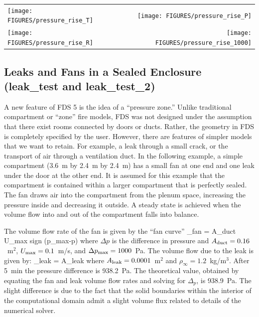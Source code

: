 \documentclass[11pt]{book}
\begin{document}
\noindent
\begin{tabular*}{\textwidth}{lr}
\texttt{[image: FIGURES/pressure\_rise\_T]} &
\texttt{[image: FIGURES/pressure\_rise\_P]} \\
\texttt{[image: FIGURES/pressure\_rise\_R]} &
\texttt{[image: FIGURES/pressure\_rise\_1000]}
\end{tabular*}




\clearpage

\subsection{Leaks and Fans in a Sealed Enclosure ({\bf leak\_test} and {\bf leak\_test\_2})  }

A new feature of FDS 5 is the idea of a ``pressure zone.''  Unlike traditional compartment or ``zone'' fire models, FDS was not designed under the assumption that there exist
rooms connected by doors or ducts. Rather, the geometry in FDS is completely specified by the user. However, there are features of simpler models that we want to retain. For example,
a leak through a small crack, or the transport of air through a ventilation duct.  In the following example, a simple compartment (3.6~m by 2.4~m by 2.4~m) has a small fan at one
end and one leak under the door at the other end. It is assumed for this example that the compartment is contained within a larger compartment that is perfectly sealed. The fan draws
air into the compartment from the plenum space, increasing the pressure inside and decreasing it outside.  A steady state is achieved when the volume flow into and out of the compartment
falls into balance.

The volume flow rate of the fan is given by the ``fan curve''
\be {}_{\hbox{\footnotesize fan}} = A_{\hbox{\footnotesize duct}} U_{\hbox{\footnotesize max}} \;
   \hbox{sign} (\Delta p_{\hbox{\footnotesize max}}-\Delta p)
     \ee
where $\Delta p$ is the difference in pressure and $A_{\hbox{\scriptsize duct}}=0.16$~m$^2$, $U_{\hbox{\scriptsize max}}=0.1$~m/s, and $\Delta p_{\hbox{\scriptsize max}}=1000$~Pa.
The volume flow due to the leak is given by:
\be {}_{\hbox{\scriptsize leak}} = A_{\hbox{\scriptsize leak}}  \ee
where $A_{\hbox{\scriptsize leak}}=0.0001$~m$^2$ and $\rho_\infty=1.2$~kg/m$^3$.
After 5~min the pressure difference is 938.2~Pa. The theoretical value, obtained by equating the fan and leak volume flow rates and solving for $\Delta_p$, is 938.9~Pa. The
slight difference is due to the fact that the solid boundaries within the interior of the computational domain admit a slight volume flux related to details of the
numerical solver.
\end{document}
